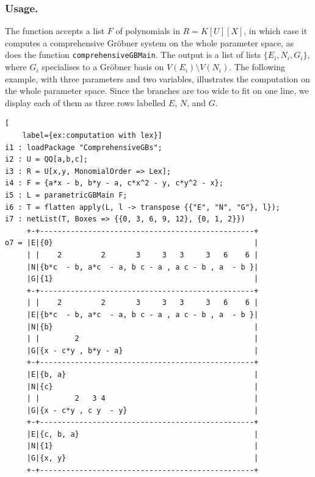 \documentclass[11pt]{amsart}
\theoremstyle{plain}
\theoremstyle{definition}
\theoremstyle{remark}
\begin{document}
\subsubsection{Usage.}
The function accepts a list $F$ of polynomials in $R=K[U][X]$, in which case it computes a comprehensive Gröbner system on the whole parameter space, as does the function \texttt{comprehensiveGBMain}.
The output is a list of lists $\{E_i,N_i,G_i\}$, where $G_i$ specialises to a Gr\"obner basis on $V(E_i)\setminus V(N_i)$.
The following example, with three parameters and two variables, illustrates the computation on the whole parameter space.
Since the branches are too wide to fit on one line, we display each of them as three rows labelled $E$, $N$, and $G$.
\begin{lstlisting}[
    label={ex:computation with lex}]
i1 : loadPackage "ComprehensiveGBs";
i2 : U = QQ[a,b,c];
i3 : R = U[x,y, MonomialOrder => Lex];
i4 : F = {a*x - b, b*y - a, c*x^2 - y, c*y^2 - x};
i5 : L = parametricGBMain F;
i6 : T = flatten apply(L, l -> transpose {{"E", "N", "G"}, l});
i7 : netList(T, Boxes => {{0, 3, 6, 9, 12}, {0, 1, 2}})
     +-+-------------------------------------------------+
o7 = |E|{0}                                              |
     | |    2         2       3     3   3     3   6    6 |
     |N|{b*c  - b, a*c  - a, b c - a , a c - b , a  - b }|
     |G|{1}                                              |
     +-+-------------------------------------------------+
     | |    2         2       3     3   3     3   6    6 |
     |E|{b*c  - b, a*c  - a, b c - a , a c - b , a  - b }|
     |N|{b}                                              |
     | |        2                                        |
     |G|{x - c*y , b*y - a}                              |
     +-+-------------------------------------------------+
     |E|{b, a}                                           |
     |N|{c}                                              |
     | |        2   3 4                                  |
     |G|{x - c*y , c y  - y}                             |
     +-+-------------------------------------------------+
     |E|{c, b, a}                                        |
     |N|{1}                                              |
     |G|{x, y}                                           |
     +-+-------------------------------------------------+
\end{lstlisting}
\end{document}
